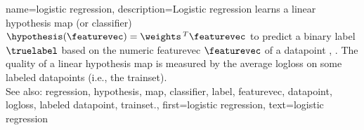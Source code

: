 {name={logistic regression}, 
	description={Logistic \gls{regression} learns a 
		linear \gls{hypothesis} \gls{map} (or \gls{classifier}) $\hypothesis(\featurevec) = \weights\,^{T} \featurevec$ 
		to predict a binary \gls{label} $\truelabel$ based on the numeric 
		\gls{featurevec} $\featurevec$ of a \gls{datapoint} \cite{BishopBook}, \cite{hastie01statisticallearning}. 
		The quality of a linear \gls{hypothesis} \gls{map} is measured by the average \gls{logloss} 
		on some \glspl{labeled datapoint} (i.e., the \gls{trainset}).
				\\
		See also: \gls{regression}, \gls{hypothesis}, \gls{map}, \gls{classifier}, \gls{label}, \gls{featurevec}, \gls{datapoint}, \gls{logloss}, \gls{labeled datapoint}, \gls{trainset}.},
	first={logistic regression},
	text={logistic regression}
}
	
